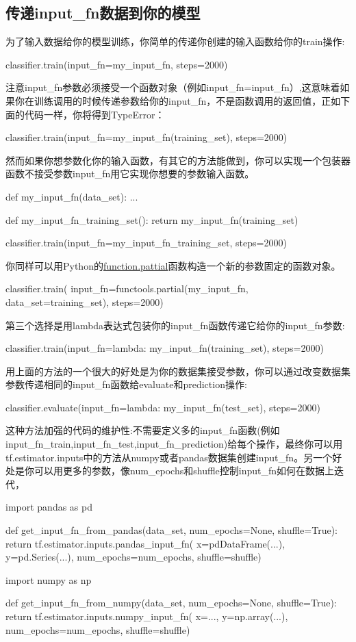 \subsection{传递input\_fn数据到你的模型}
为了输入数据给你的模型训练，你简单的传递你创建的输入函数给你的train操作:
\begin{python}
classifier.train(input_fn=my_input_fn, steps=2000)
\end{python}
注意input\_fn参数必须接受一个函数对象（例如input\_fn=input\_fn）,这意味着如果你在训练调用的时候传递参数给你的input\_fn，不是函数调用的返回值，正如下面的代码一样，你将得到TypeError：
\begin{python}
classifier.train(input_fn=my_input_fn(training_set), steps=2000)
\end{python}
然而如果你想参数化你的输入函数，有其它的方法能做到，你可以实现一个包装器函数不接受参数input\_fn用它实现你想要的参数输入函数。
\begin{python}
def my_input_fn(data_set):
  ...

def my_input_fn_training_set():
  return my_input_fn(training_set)

classifier.train(input_fn=my_input_fn_training_set, steps=2000)
\end{python}
你同样可以用Python的\href{https://docs.python.org/2/library/functools.html#functools.partial}{function.pattial}函数构造一个新的参数固定的函数对象。
\begin{python}
classifier.train(
    input_fn=functools.partial(my_input_fn, data_set=training_set),
    steps=2000)
\end{python}
第三个选择是用lambda表达式包装你的input\_fn函数传递它给你的input\_fn参数:
\begin{python}
classifier.train(input_fn=lambda: my_input_fn(training_set), steps=2000)
\end{python}
用上面的方法的一个很大的好处是为你的数据集接受参数，你可以通过改变数据集参数传递相同的input\_fn函数给evaluate和prediction操作:
\begin{python}
classifier.evaluate(input_fn=lambda: my_input_fn(test_set), steps=2000)
\end{python}
这种方法加强的代码的维护性:不需要定义多的input\_fn函数(例如input\_fn\_train,input\_fn\_test,input\_fn\_prediction)给每个操作，最终你可以用tf.estimator.inputs中的方法从numpy或者pandas数据集创建input\_fn。另一个好处是你可以用更多的参数，像num\_epochs和shuffle控制input\_fn如何在数据上迭代，
\begin{python}
import pandas as pd

def get_input_fn_from_pandas(data_set, num_epochs=None, shuffle=True):
  return tf.estimator.inputs.pandas_input_fn(
      x=pdDataFrame(...),
      y=pd.Series(...),
      num_epochs=num_epochs,
      shuffle=shuffle)
\end{python}
\begin{python}
import numpy as np

def get_input_fn_from_numpy(data_set, num_epochs=None, shuffle=True):
  return tf.estimator.inputs.numpy_input_fn(
      x={...},
      y=np.array(...),
      num_epochs=num_epochs,
      shuffle=shuffle)
\end{python}
